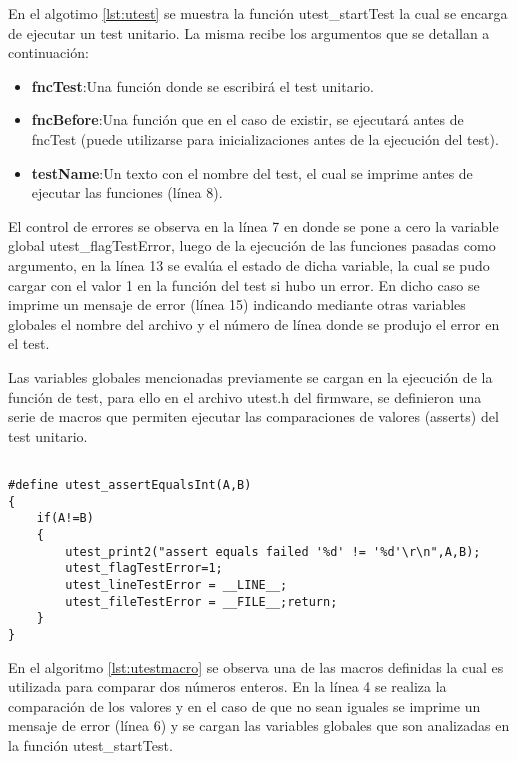 En el algotimo \ref{lst:utest} se muestra la función utest\_startTest la cual se encarga de ejecutar un test unitario. La misma recibe los argumentos que se detallan a continuación:

\begin{itemize}
	\item \textbf{fncTest}:Una función donde se escribirá el test unitario.
	\item \textbf{fncBefore}:Una función que en el caso de existir, se ejecutará antes de fncTest (puede utilizarse para inicializaciones antes de la ejecución del test).
	\item \textbf{testName}:Un texto con el nombre del test, el cual se imprime antes de ejecutar las funciones (línea 8).	
\end{itemize}
	
El control de errores se observa en la línea 7 en donde se pone a cero la variable global utest\_flagTestError, luego de la ejecución de las funciones pasadas como argumento, en la línea 13 se evalúa el estado de dicha variable, la cual se pudo cargar con el valor 1 en la función del test si hubo un error. En dicho caso se imprime un mensaje de error (línea 15) indicando mediante otras variables globales el nombre del archivo y el número de línea donde se produjo el error en el test.

Las variables globales mencionadas previamente se cargan en la ejecución de la función de test, para ello en el archivo utest.h del firmware, se definieron una serie de macros que permiten ejecutar las comparaciones de valores (asserts) del test unitario.

\begin{lstlisting}[label={lst:utestmacro},caption=Ejemplo de una macro assert incluida en el archivo utest.h del firmware.]

#define utest_assertEqualsInt(A,B)	
{ 
	if(A!=B)
	{ 
		utest_print2("assert equals failed '%d' != '%d'\r\n",A,B); 
		utest_flagTestError=1; 
		utest_lineTestError = __LINE__;  
		utest_fileTestError = __FILE__;return; 
	} 
}
\end{lstlisting}

En el algoritmo \ref{lst:utestmacro} se observa una de las macros definidas la cual es utilizada para comparar dos números enteros. En la línea 4 se realiza la comparación de los valores y en el caso de que no sean iguales se imprime un mensaje de error (línea 6) y se cargan las variables globales que son analizadas en la función utest\_startTest.

